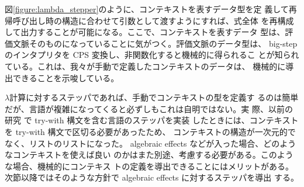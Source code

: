 図\ref{figure:lambda_stepper}のように、コンテキストを表すデータ型を定
義して再帰呼び出し時の構造に合わせて引数として渡すようにすれば、式全体
を再構成して出力することが可能になる。ここで、コンテキストを表すデータ
型は、評価文脈そのものになっていることに気がつく。評価文脈のデータ型は、
big-step のインタプリタを CPS 変換し、非関数化すると機械的に得られるこ
とが知られている。これは、我々が手動で定義したコンテキストのデータは、
機械的に導出できることを示唆している。

$\lambda$計算に対するステッパであれば、手動でコンテキストの型を定義す
るのは簡単だが、言語が複雑になってくると必ずしもこれは自明ではない。実
際、以前の研究 \cite{FCA19} で try-with 構文を含む言語のステッパを実装
したときには、コンテキストを try-with 構文で区切る必要があったため、
コンテキストの構造が一次元的でなく、リストのリストになった。
algebraic effects などが入った場合、どのようなコンテキストを使えば良い
のかはまた別途、考慮する必要がある。このような場合、機械的にコンテキス
トの定義を導出できることにはメリットがある。
次節以降ではそのような方針で algebraic effects に対するステッパを導出
する。


